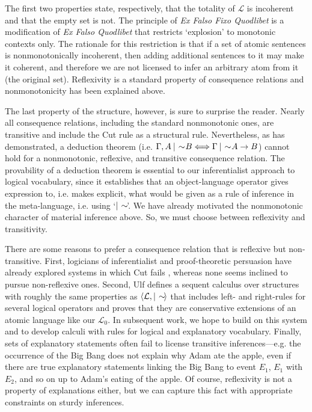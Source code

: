 \documentclass{article}                     %
\makeatletter
\newcommand{\nmc}{%
	\mathbin{\mathpalette\nm@\expandafter}
}
\newcommand{\nm@}{\mid\joinrel\mkern-.5mu\sim\mkern-3mu}
\makeatother
\begin{document}
The first two properties state, respectively, that the totality of $ \mathcal{L} $ is incoherent and that the empty set is not. The principle of \textit{Ex Falso Fixo Quodlibet} is a modification of \textit{Ex Falso Quodlibet} that restricts `explosion' to monotonic contexts only. The rationale for this restriction is that if a set of atomic sentences is nonmonotonically incoherent, then adding additional sentences to it may make it coherent, and therefore we are not licensed to infer an arbitrary atom from it (the original set). Reflexivity is a standard property of consequence relations and nonmonotonicity has been explained above. 

The last property of the structure, however, is sure to surprise the reader. Nearly all consequence relations, including the standard nonmonotonic ones, are transitive and include the Cut rule as a structural rule. Nevertheless, as \cite{Morgan2000} has demonstrated,  a deduction theorem (i.e. $\Gamma, A \nmc B \Longleftrightarrow \Gamma \nmc A \rightarrow B $) cannot hold for a nonmonotonic, reflexive, and transitive consequence relation.  The provability of a deduction theorem is essential to our inferentialist approach to logical vocabulary, since it establishes that an object-language operator gives expression to, i.e. makes explicit, what would be given as a rule of inference in the meta-language, i.e. using `$ \nmc $'. We have already motivated the nonmonotonic character of material inference above. So, we must choose between  reflexivity and transitivity. 

There are some reasons to prefer a consequence relation that is reflexive but non-transitive.  First, logicians of inferentialist and proof-theoretic persuasion have already explored systems in which Cut fails \citep{Ripley2011,Tennant2014}, whereas none seems inclined to pursue non-reflexive ones. Second, Ulf \cite{Hlobil2016}  defines a sequent calculus over structures with roughly the same properties as  $ \langle \mathcal{L}, \nmc \rangle $ that includes left- and right-rules for several logical operators and proves that they are conservative extensions of an atomic language like our $ \mathcal{L}_0 $. In subsequent work, we hope to build on this system and to develop calculi with rules for logical and explanatory vocabulary. Finally, sets of explanatory statements often fail to license transitive inferences---e.g. the occurrence of the Big Bang does not explain why Adam ate the apple, even if there are true explanatory statements linking the Big Bang to event $E_1$, $ E_1 $ with $ E_2 $, and so on up to Adam's eating of the apple. Of course, reflexivity is not a property of explanations either, but we can capture this fact with appropriate constraints on sturdy inferences.
\end{document}
